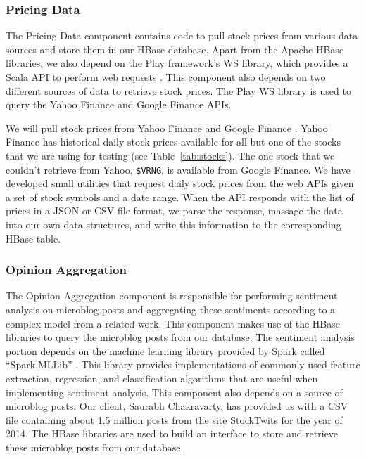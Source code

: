 \subsubsection{Pricing Data}

The Pricing Data component contains code to pull stock prices from various data sources and store them in our HBase database. Apart from the Apache HBase libraries, we also depend on the Play framework's \cite{playframework} WS library, which provides a Scala API to perform web requests \cite{playws}. This component also depends on two different sources of data to retrieve stock prices. The Play WS library is used to query the Yahoo Finance and Google Finance APIs.

We will pull stock prices from Yahoo Finance \cite{yahoofinance} and Google Finance \cite{googlefinance}. Yahoo Finance has historical daily stock prices available for all but one of the stocks that we are using for testing (see Table~\ref{tab:stocks}). The one stock that we couldn't retrieve from Yahoo, \texttt{\$VRNG}, is available from Google Finance. We have developed small utilities that request daily stock prices from the web APIs given a set of stock symbols and a date range. When the API responds with the list of prices in a JSON \cite{json} or CSV \cite{csv} file format, we parse the response, massage the data into our own data structures, and write this information to the corresponding HBase table.

\subsubsection{Opinion Aggregation}

The Opinion Aggregation component is responsible for performing sentiment analysis on microblog posts and aggregating these sentiments according to a complex model from a related work. This component makes use of the HBase libraries to query the microblog posts from our database. The sentiment analysis portion depends on the machine learning library provided by Spark called ``Spark.MLLib'' \cite{sparkml}. This library provides implementations of commonly used feature extraction, regression, and classification algorithms that are useful when implementing sentiment analysis. This component also depends on a source of microblog posts. Our client, Saurabh Chakravarty, has provided us with a CSV file containing about 1.5 million posts from the site StockTwits \cite{stocktwits} for the year of 2014. The HBase libraries are used to build an interface to store and retrieve these microblog posts from our database.

